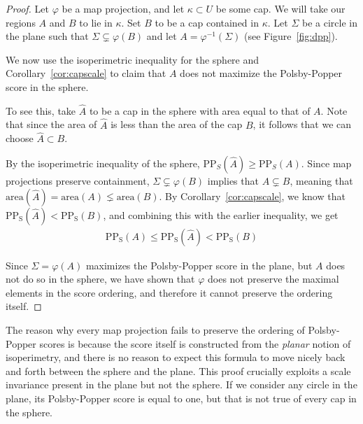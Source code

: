 \begin{proof}
  Let $\varphi$ be a map projection, and let 
  $\kappa \subset U$ be some cap. We will take our regions 
  $A$ and $B$ to lie in $\kappa$. Set $B$ to be a cap 
  contained in $\kappa$. Let $\Sigma$ be a circle in 
  the plane such that $\Sigma
  \subsetneq \varphi(B)$ and let $A=\varphi^{-1}(\Sigma)$ (see
  Figure~\ref{fig:dpp}).

  We now use the isoperimetric inequality for the sphere 
  and Corollary~\ref{cor:capscale} to claim that 
  $A$ does not maximize the Polsby-Popper score in the sphere.

  To see this, take $\hat{A}$ to be a cap in the sphere with 
  area equal to that of $A$. Note that since the 
  area of $\hat {A}$ is less than the area of the cap $B$, it 
  follows that we can choose $\hat{A}\subset B$. 
  
  By the isoperimetric inequality of the sphere, 
  $\mathrm{PP}_S(\hat{A})\geq
  \mathrm{PP}_S(A)$. Since map projections preserve containment,
  $\Sigma\subsetneq \varphi(B)$ implies that $A\subsetneq B$, 
  meaning that $\mathrm{area}(\hat A) = \mathrm{area}(A)\lneq 
  \mathrm{area}(B)$. By Corollary~\ref{cor:capscale}, we know that
  $\mathrm{PP_S}(\hat{A})< \mathrm{PP_S}(B)$, and combining this with
  the earlier inequality, we get
  \begin{align*}
    \mathrm{PP_S}({A})\leq \mathrm{PP_S}(\hat{A})< \mathrm{PP_S}(B)
  \end{align*}

  Since $\Sigma = \varphi(A)$ maximizes the Polsby-Popper score in the
  plane, but $A$ does not do so in the sphere, we have shown that
  $\varphi$ does not preserve the maximal elements in the score
  ordering, and therefore it cannot preserve the ordering itself.
\end{proof}

The reason why every map projection fails to preserve the ordering of
Polsby-Popper scores is because the score itself is constructed from
the \textit{planar} notion of isoperimetry, and there is no reason to
expect this formula to move nicely back and forth between the sphere
and the plane.  This proof crucially exploits a scale invariance
present in the plane but not the sphere.  If we consider any circle in
the plane, its Polsby-Popper score is equal to one,
but that is not true of every cap in the sphere.  
